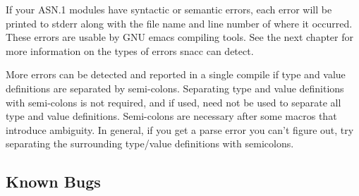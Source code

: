 If your ASN.1 modules have syntactic or semantic errors, each error
will be printed to {\C stderr} along with the file name and line number of
where it occurred. These errors are usable by GNU emacs compiling
tools.  See the next chapter for more information on the types of
errors snacc can detect.

More errors can be detected and reported in a single compile if type
and value definitions are separated by semi-colons.  Separating type
and value definitions with semi-colons is not required, and if used,
need not be used to separate all type and value definitions.
Semi-colons are necessary after some macros that introduce ambiguity.
In general, if you get a parse error you can't figure out, try
separating the surrounding type/value definitions with semicolons.


\subsection{Known Bugs}

